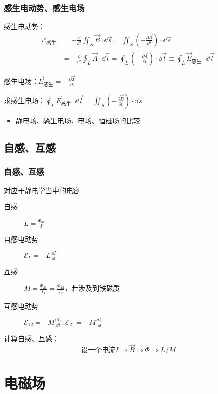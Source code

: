 \documentclass{beamer}
\begin{document}
\begin{frame}[c]
    \frametitle{感生电动势、感生电场}

    感生电动势：
    $$\begin{aligned}
            \mathcal{E}_{\text{感生}} & =-\frac{\dd}{\dd t}\iint_S\vec{B}\cdot\dd\vec{s}=\iint_S(-\frac{\partial\vec{B}}{\partial t})\cdot\dd\vec{s}                                                \\
                                    & =-\frac{\dd}{\dd t}\oint_L\vec{A}\cdot\dd\vec{l}=\oint_L(-\frac{\partial\vec{A}}{\partial t})\cdot\dd\vec{l}\equiv\oint_L\vec{E}_{\text{感生}}\cdot\dd\vec{l}
        \end{aligned}$$

    感生电场：$\vec{E}_{\text{感生}}=-\frac{\partial \vec{A}}{\partial t}$

    求感生电场：$\oint_L\vec{E}_{\text{感生}}\cdot\dd\vec{l}=\iint_S(-\frac{\partial\vec{B}}{\partial t})\cdot\dd\vec{s}$

    \begin{itemize}
        \item 静电场、感生电场、电场、恒磁场的比较
    \end{itemize}
\end{frame}

\subsection{自感、互感}

\begin{frame}[c]
    \frametitle{自感、互感}

    对应于静电学当中的电容

    \begin{description}
        \item[自感] $L=\frac{\Phi_m}{I}$
        \item[自感电动势] $\mathcal{E}_L=-L\frac{\dd I}{\dd t}$
        \item[互感] $M=\frac{\Phi_{21}}{I_1}=\frac{\Phi_{12}}{I_2}$，若涉及到铁磁质
        \item[互感电动势] $\mathcal{E}_{12}=-M\frac{\dd I_2}{\dd t}, \mathcal{E}_{21}=-M\frac{\dd I_1}{\dd t}$
    \end{description}
    计算自感、互感：
    $$\text{设一个电流}I\Rightarrow\vec{B}\Rightarrow\Phi\Rightarrow L/M$$
\end{frame}

\section{电磁场}
\end{document}
